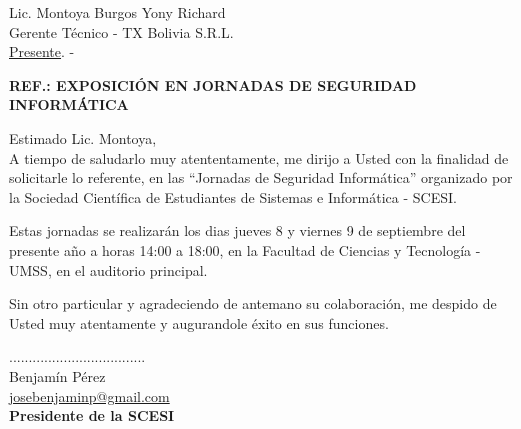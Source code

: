 \documentclass[letterpaper,12pt]{letter}
\begin{document}
\begin{letter}{Lic. Montoya Burgos Yony Richard \\ Gerente Técnico - TX Bolivia S.R.L. \\ \underline {Presente}. -}

\begin{center}
	\opening{\textbf{REF.: EXPOSICI\'ON EN JORNADAS DE SEGURIDAD INFORM\'ATICA}}
\end{center}

Estimado Lic. Montoya,\\

A tiempo de saludarlo muy atententamente, me dirijo a Usted con la finalidad de solicitarle lo referente, 
en las ``Jornadas de Seguridad Inform\'atica'' organizado por la Sociedad Cient\'ifica de Estudiantes de 
Sistemas e Inform\'atica - SCESI.

Estas jornadas se realizar\'an los dias jueves 8 y viernes 9 de septiembre del presente a\~no a horas 14:00 a 
18:00, en la Facultad de Ciencias y Tecnolog\'ia - UMSS, en el auditorio principal.

Sin otro particular y agradeciendo de antemano su colaboraci\'on, me despido de Usted muy atentamente y augurandole \'exito en sus funciones.\\

\vspace{4cm}

\begin{center}
...................................\\
Benjam\'in P\'erez\\
\url {josebenjaminp@gmail.com} \\
{\bfseries Presidente de la  SCESI}
\end{center}

\end{letter}
\end{document}
